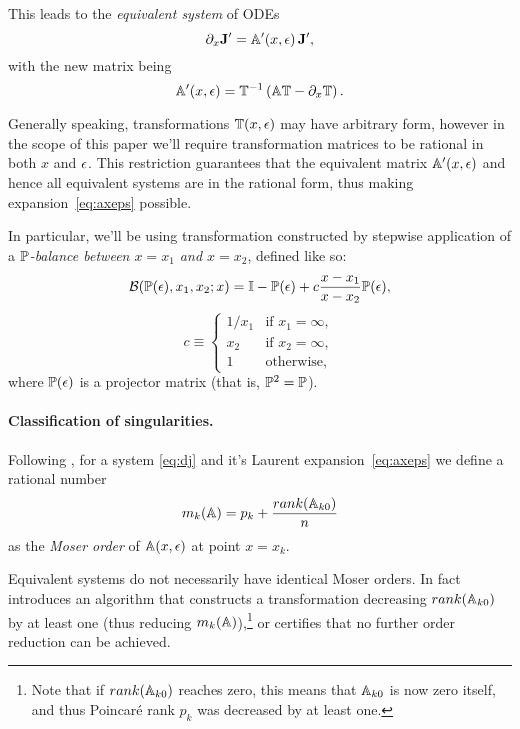 \documentclass[12pt,a4paper]{article}
\begin{document}
This leads to the {\em equivalent system} of ODEs
\begin{equation}
  \partial_x \mathbf{J}' = \mathbb{A}'(x,\epsilon)\,\mathbf{J}',
\end{equation}
with the new matrix being
\begin{equation}
\label{eq:ta}
  \mathbb{A}'(x,\epsilon) = \mathbb{T}^{-1} \left( \mathbb{A} \mathbb{T} - \partial_x \mathbb{T} \right).
\end{equation}

Generally speaking, transformations $\mathbb{T}(x,\epsilon)$ may have arbitrary form, however in the scope of this paper we'll require transformation matrices to be rational in both $x$ and $\epsilon$.
This restriction guarantees that the equivalent matrix $\mathbb{A}'(x,\epsilon)$ and hence all equivalent systems are in the rational form, thus making expansion~\eqref{eq:axeps} possible.

In particular, we'll be using transformation constructed by stepwise application of a \textit{$\mathbb{P}$-balance between $x=x_1$ and $x=x_2$}, defined like so:
\begin{equation}
\label{eq:bal}
    \mathcal{B}(\mathbb{P}(\epsilon), x_1, x_2; x) = \mathbb{I} - \mathbb{P}(\epsilon) + c \frac{x-x_1}{x-x_2} \mathbb{P}(\epsilon),
\end{equation}
\begin{equation*}
    c \equiv
    \begin{cases}
        1/x_1 & \text{if $x_1=\infty$}, \\
        x_2 & \text{if $x_2=\infty$}, \\
        1 & \text{otherwise},
    \end{cases}
\end{equation*}
where $\mathbb{P}(\epsilon)$ is a projector matrix (that is, $\mathbb{P}^2=\mathbb{P}$).

\paragraph{Classification of singularities.}
Following \cite{Mos59}, for a system \eqref{eq:dj} and it's Laurent expansion~\eqref{eq:axeps} we define a rational number
\begin{equation}
\label{eq:mk}
    m_k(\mathbb{A}) = p_k + \frac{rank(\mathbb{A}_{k0})}{n}
\end{equation}
as the {\em Moser order} of $\mathbb{A}(x,\epsilon)$ at point $x=x_k$.

Equivalent systems do not necessarily have identical Moser orders.
In fact \cite{Mos59} introduces an algorithm that constructs a transformation decreasing $rank(\mathbb{A}_{k0})$ by at least one (thus reducing $m_k(\mathbb{A})$),\footnote{Note that if $rank(\mathbb{A}_{k0})$ reaches zero, this means that $\mathbb{A}_{k0}$ is now zero itself, and thus Poincar\'e rank $p_k$ was decreased by at least one.} or certifies that no further order reduction can be achieved.
\end{document}
